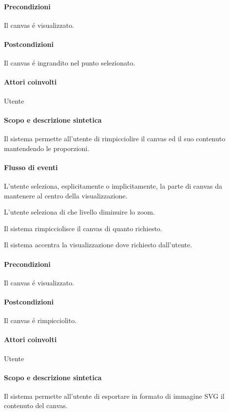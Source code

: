 \paragraph{Precondizioni} Il canvas \'e visualizzato.
\paragraph{Postcondizioni} Il canvas \'e ingrandito nel punto selezionato.

\paragraph{Attori coinvolti} Utente
\paragraph{Scopo e descrizione sintetica} 
Il sistema permette all'utente di rimpicciolire il canvas ed il suo contenuto mantendendo le proporzioni.
\paragraph{Flusso di eventi}
\begin{elenconumerato}[\textbf{}]{\subsubsecindent}
\item L'utente seleziona, esplicitamente o implicitamente, la parte di canvas da mantenere al centro della visualizzazione.
\item L'utente seleziona di che livello diminuire lo zoom.
\item Il sistema rimpicciolisce il canvas di quanto richiesto.
\item Il sistema accentra la visualizzazione dove richiesto dall'utente.
\end{elenconumerato}
\paragraph{Precondizioni} Il canvas \'e visualizzato.
\paragraph{Postcondizioni} Il canvas \'e rimpicciolito.

\paragraph{Attori coinvolti} Utente
\paragraph{Scopo e descrizione sintetica} 
Il sistema permette all'utente di esportare in formato di immagine SVG il contenuto del canvas.
